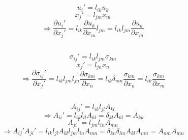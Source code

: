 \documentclass[12pt]{article}
\newcommand{\pr}{{\partial}}
\begin{document}
\subsection{}
\[
u_i' = l_{ik}u_k
\]
\[
x_j' = l_{jm}x_m
\]
\[
\Rightarrow\frac{\pr u_i'}{\pr x_j'} = l_{ik}\frac{\pr u_k}{\pr x_m}l_{jm} =  l_{ik}l_{jm} \frac{\pr u_k}{\pr x_m}
\]


\subsection{}
\[
\sigma_{ij}' = l_{ik}l_{jm}\sigma_{km}
\]
\[
x_j' = l_{jn}x_n
\]
\[
\Rightarrow\frac{\pr \sigma_{ij}' }{\pr x_j'} = l_{ik}l_{jm}l_{jn}\frac{\pr \sigma_{km}}{\pr x_n} = l_{ik}\delta_{mn}\frac{\sigma_{km}}{\pr x_n} = l_{ik}\frac{\sigma_{km}}{\pr x_m} 
\]

\subsection{}
\[
A_{ij}'  = l_{ik} l_{jl}A_{kl}
\]
\[
\Rightarrow A_{ii}' =   l_{ik} l_{il}A_{kl} = \delta_{kl} A_{kl} = A_{kk}
\]
\[
A_{ji}'  = l_{jm} l_{in}A_{mn}
\]
\[
\Rightarrow A_{ij}'A_{ji}' = l_{ik} l_{jl}A_{kl}l_{jm} l_{in}A_{mn} = \delta_{kn}\delta_{lm}A_{kl}A_{mn} = A_{nm}A_{mn}
\]
\end{document}
